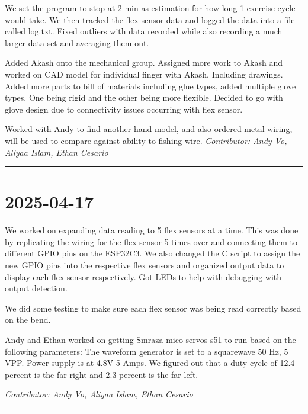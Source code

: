\documentclass[12pt]{article}
\begin{document}
We set the program to stop at 2 min as estimation for how long 1 exercise cycle would take. We then tracked the flex sensor data and logged the data into a file called log.txt. Fixed outliers with data recorded while also recording a much larger data set and averaging them out.

Added Akash onto the mechanical group. Assigned more work to Akash and worked on CAD model for individual finger with Akash. Including drawings.
Added more parts to bill of materials including glue types, added multiple glove types. One being rigid and the other being more flexible. Decided to go with glove design due to connectivity issues occurring with flex sensor.

Worked with Andy to find another hand model, and also ordered metal wiring, will be used to compare against ability to fishing wire.
\vspace{1em}
\noindent\textit{Contributor: Andy Vo, Aliyaa Islam, Ethan Cesario}
\vspace{1em}
\hrule

\section*{2025-04-17}
We worked on expanding data reading to 5 flex sensors at a time. This was done by replicating the wiring for the flex sensor 5 times over and connecting them to different GPIO pins on the ESP32C3. We also changed the C script to assign the new GPIO pins into the respective flex sensors and organized output data to display each flex sensor respectively. Got LEDs to help with debugging with output detection.

We did some testing to make sure each flex sensor was being read correctly based on the bend.

Andy and Ethan worked on getting Smraza mico-servos s51 to run based on the following parameters:
The waveform generator is set to a squarewave 50 Hz, 5 VPP. Power supply is at 4.8V 5 Amps. We figured out that a duty cycle of 12.4 percent is the far right and 2.3 percent is the far left.



\vspace{1em}
\noindent\textit{Contributor: Andy Vo, Aliyaa Islam, Ethan Cesario}
\vspace{1em}
\hrule
\end{document}
